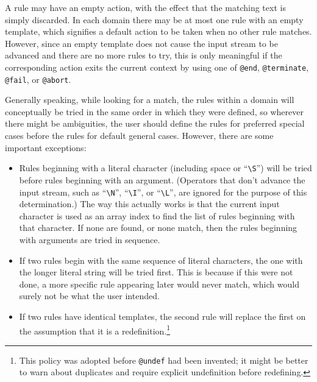 A rule may have an empty action, with the effect that the matching text is
simply discarded.  In each domain there may be at most one rule with an
empty template, which signifies a default action to be taken when no other
rule matches.  However, since an empty template does not cause the input
stream to be advanced and there are no more rules to try, this is only
meaningful if the corresponding action exits the current context by using
one of \verb/@end/, \verb/@terminate/, \verb/@fail/, or \verb/@abort/.

Generally speaking, while looking for a match, the rules within a domain will
conceptually be tried in the same order in which they were defined, so
wherever there might be ambiguities, the user should define the rules
for preferred special cases before the rules for default general cases.
However, there are some important exceptions:
\begin{itemize}
\item Rules beginning with a literal character (including space or
``\verb/\S/'') will be tried before rules beginning with an argument.
(Operators that don't advance the input stream, such as ``\verb/\N/'',
``\verb/\I/'', or ``\verb/\L/'', are ignored for the purpose of this
determination.)  The way this actually works is that the current input
character is used as an array index to find the list of rules beginning
with that character.  If none are found, or none match, then the rules
beginning with arguments are tried in sequence.

\item If two rules begin with the same sequence of literal characters,
the one with the longer literal string will be tried first.  This is
because if this were not done, a more specific rule appearing later
would never match, which would surely not be what the user intended.

\item If two rules have identical templates, the second rule will replace the
first on the assumption that it is a redefinition.\footnote{This policy
was adopted before {\tt @undef} had been invented; it might be better to
warn about duplicates and require explicit undefinition before redefining.}
\end{itemize}

